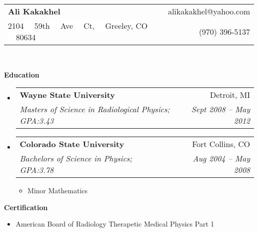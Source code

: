 \documentclass[letterpaper,10pt]{article}
\makeatletter
\newcommand{\resitem}[1]{\item #1 \vspace{-2pt}}
\newcommand{\resheading}[1]{{\large \colorbox{mygrey}{\begin{minipage}{\textwidth}{\textbf{#1 \vphantom{p\^{E}}}}\end{minipage}}}}
\newcommand{\ressubheading}[4]{
\begin{tabular*}{6.5in}{l@{\extracolsep{\fill}}r}
		\textbf{#1} & #2 \\
		\textit{#3} & \textit{#4} \\
\end{tabular*}\vspace{-6pt}}
\makeatother
\begin{document}
\newcommand{\mywebheader}{
\begin{tabular*}{7in}{l@{\extracolsep{\fill}}r}
	\textbf{\LARGE Ali Kakakhel} & alikakakhel@yahoo.com\\
	{\footnotesize \colorbox{white}{2104 \ \  59th \ \  Ave \ \  Ct, \ \  Greeley, CO \ \  80634}} & (970) 396-5137 \\
	\end{tabular*}
\\
\vspace{0.1in}}

\mywebheader

\resheading{Education}
	\begin{itemize}
		\item
			\ressubheading{Wayne State University}{Detroit, MI}{Masters of Science in Radiological Physics; GPA:3.43}{Sept 2008 -- May 2012}
		\item
			\ressubheading{Colorado State University}{Fort Collins, CO}{Bachelors of Science in Physics; GPA:3.78}{Aug 2004 -- May 2008}
				{ \footnotesize
				\begin{itemize}
					\resitem{Minor Mathematics}
				\end{itemize}
				}	
	\end{itemize} %

\resheading{Certification}
\begin{itemize}
	\item American Board of Radiology Therapetic Medical Physics Part 1
\end{itemize}
\end{document}
